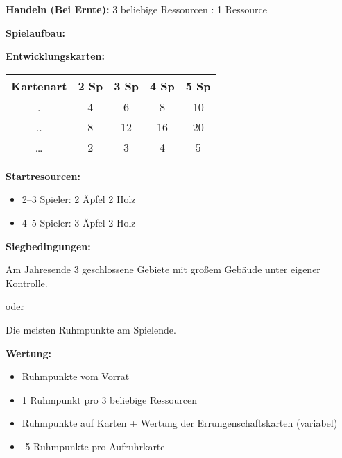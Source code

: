 \documentclass[fontsize=6pt]{scrreprt}
\begin{document}
  \textbf{Handeln (Bei Ernte):} 3 beliebige Ressourcen : 1 Ressource

  \textbf{Spielaufbau:}

  \textbf{Entwicklungskarten:}

  \begin{tabular}{c|cccc}
    Kartenart & 2 Sp & 3 Sp & 4 Sp & 5 Sp \\ \hline
    .      & 4 & 6  & 8  & 10 \\
    ..     & 8 & 12 & 16 & 20 \\
    \ldots & 2 & 3  & 4  & 5  \\
  \end{tabular}

  \textbf{Startresourcen:}
  \begin{itemize}[topsep=1pt, partopsep=0pt, parsep=0pt, itemsep=0pt, leftmargin=12pt]
    \item 2--3 Spieler: 2 Äpfel 2 Holz
    \item 4--5 Spieler: 3 Äpfel 2 Holz
  \end{itemize}

  \textbf{Siegbedingungen:}
  \begin{center}
  Am Jahresende 3 geschlossene Gebiete mit großem Gebäude unter eigener Kontrolle.

  oder

  Die meisten Ruhmpunkte am Spielende.
  \end{center}

  \textbf{Wertung:}
  \begin{itemize}[topsep=1pt, partopsep=0pt, parsep=0pt, itemsep=0pt, leftmargin=12pt]
    \item Ruhmpunkte vom Vorrat
    \item 1 Ruhmpunkt pro 3 beliebige Ressourcen
    \item Ruhmpunkte auf Karten + Wertung der Errungenschaftskarten (variabel)
    \item -5 Ruhmpunkte pro Aufruhrkarte
  \end{itemize}
\end{document}
